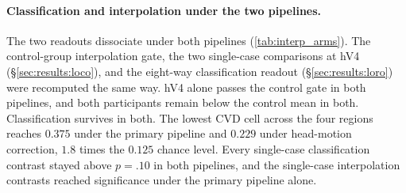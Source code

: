 \paragraph{Classification and interpolation under the two pipelines.}
The two readouts dissociate under both pipelines (\cref{tab:interp_arms}). The control-group interpolation gate, the two single-case comparisons at hV4 (\S\ref{sec:results:loco}), and the eight-way classification readout (\S\ref{sec:results:loro}) were recomputed the same way. hV4 alone passes the control gate in both pipelines, and both participants remain below the control mean in both. Classification survives in both. The lowest CVD cell across the four regions reaches $0.375$ under the primary pipeline and $0.229$ under head-motion correction, $1.8$ times the $0.125$ chance level. Every single-case classification contrast stayed above $p = .10$ in both pipelines, and the single-case interpolation contrasts reached significance under the primary pipeline alone.

